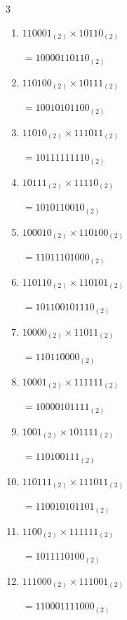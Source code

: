 \begin{multicols}{3}
\begin{enumerate}
        $=10111101_{(2)}$

\columnbreak %

\resetques

  \item $110001_{(2)} \times 10110_{(2)}$

        $=10000110110_{(2)}$

  \item $110100_{(2)} \times 10111_{(2)}$

        $=10010101100_{(2)}$

  \item $11010_{(2)} \times 111011_{(2)}$

        $=10111111110_{(2)}$

  \item $10111_{(2)} \times 11110_{(2)}$

        $=1010110010_{(2)}$

  \item $100010_{(2)} \times 110100_{(2)}$

        $=11011101000_{(2)}$

\columnbreak %

  \item $110110_{(2)} \times 110101_{(2)}$

        $=101100101110_{(2)}$

  \item $10000_{(2)} \times 11011_{(2)}$

        $=110110000_{(2)}$

  \item $10001_{(2)} \times 111111_{(2)}$

        $=10000101111_{(2)}$

  \item $1001_{(2)} \times 101111_{(2)}$

        $=110100111_{(2)}$

  \item $110111_{(2)} \times 111011_{(2)}$

        $=110010101101_{(2)}$

\columnbreak %

  \item $1100_{(2)} \times 111111_{(2)}$

        $=1011110100_{(2)}$

  \item $111000_{(2)} \times 111001_{(2)}$

        $=110001111000_{(2)}$


\end{enumerate}
\end{multicols}
